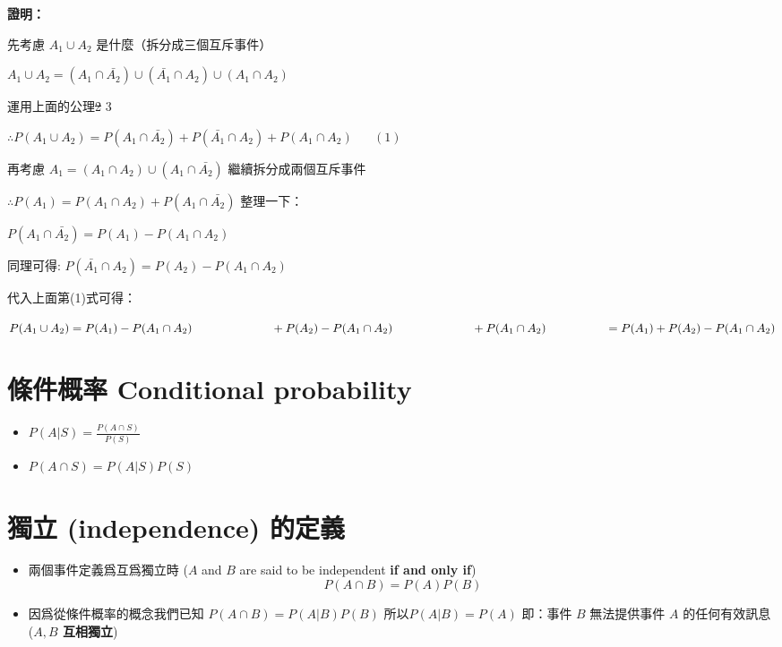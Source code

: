 \documentclass[]{ctexbook}
\providecommand{\tightlist}{%
  \setlength{\itemsep}{0pt}\setlength{\parskip}{0pt}}
\begin{document}
\textbf{證明：}

先考慮 \(A_1 \cup A_2\) 是什麼（拆分成三個互斥事件）

\(A_1 \cup A_2 = (A_1\cap \bar{A_2})\cup(\bar{A_1}\cap A_2)\cup(A_1\cap A_2)\)

運用上面的公理\sout{2} 3

\(\therefore P(A_1 \cup A_2) = P(A_1\cap \bar{A_2}) + P(\bar{A_1}\cap A_2) + P(A_1\cap A_2) \;\;\;\;\;\;(1)\)

再考慮 \(A_1=(A_1\cap A_2)\cup(A_1\cap\bar{A_2})\)
繼續拆分成兩個互斥事件

\(\therefore P(A_1)=P(A_1\cap A_2)+P(A_1\cap\bar{A_2})\) 整理一下：

\(P(A_1\cap\bar{A_2})=P(A_1)-P(A_1\cap A_2)\)

同理可得: \(P(\bar{A_1}\cap A_2)=P(A_2)-P(A_1\cap A_2)\)

代入上面第(1)式可得：

\(P(A_1 \cup A_2) =P(A_1)-P(A_1\cap A_2)\\ \;\;\;\;\;\;\;\;\;\;\;\;\;\;\;\;\;\;\;\;\;\;\;\;+P(A_2)-P(A_1\cap A_2)\\ \;\;\;\;\;\;\;\;\;\;\;\;\;\;\;\;\;\;\;\;\;\;\;\;+P(A_1\cap A_2)\\ \;\;\;\;\;\;\;\;\;\;\;\;\;\;\;\;\;\;=P(A_1) + P(A_2) - P(A_1 \cap A_2)\)

\section{條件概率 Conditional
probability}\label{-conditional-probability}

\begin{itemize}
\tightlist
\item
  \(P(A|S)=\frac{P(A\cap S)}{P(S)}\)
\item
  \(P(A\cap S) = P(A|S)P(S)\)
\end{itemize}

\section{獨立 (independence) 的定義}\label{-independence-}

\begin{itemize}
\tightlist
\item
  兩個事件定義爲互爲獨立時 (\(A\) and \(B\) are said to be independent
  \textbf{if and only if}) \[P(A\cap B)=P(A)P(B)\]
\item
  因爲從條件概率的概念我們已知 \(P(A\cap B) = P(A|B)P(B)\)
  所以\(P(A|B)=P(A)\) 即：事件 \(B\) 無法提供事件 \(A\) 的任何有效訊息
  (\textbf{\(A, B\) 互相獨立})
\end{itemize}
\end{document}
